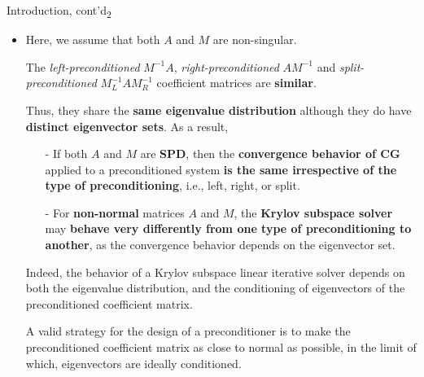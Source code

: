 \documentclass[t,usepdftitle=false]{beamer}
\begin{document}
\begin{frame}{Introduction, cont'd\textsubscript{2}}
\begin{itemize}
\item Here, we assume that both $A$ and $M$ are non-singular.
\item[] The \textit{left-preconditioned} $M^{-1}A$, \textit{right-preconditioned} $AM^{-1}$ and \textit{split-preconditioned} $M_L^{-1}AM_R^{-1}$ coefficient matrices are \textbf{similar}.
\item[] Thus, they share the \textbf{same eigenvalue distribution} although they do have \textbf{distinct eigenvector sets}.
As a result,
\begin{itemize}\normalsize
\item[-] If both $A$ and $M$ are \textbf{SPD}, then the \textbf{convergence behavior of CG} applied to a preconditioned system \textbf{is the same irrespective of the type of preconditioning}, i.e., left, right, or split.
\item[-] For \textbf{non-normal} matrices $A$ and $M$, the \textbf{Krylov subspace solver} may \textbf{behave very differently from one type of preconditioning to another}, as the convergence behavior depends on the eigenvector set.
\end{itemize}
Indeed, the behavior of a Krylov subspace linear iterative solver depends on both the eigenvalue distribution, and the conditioning of eigenvectors of the preconditioned coefficient matrix.
\item[] A valid strategy for the design of a preconditioner is to make the preconditioned coefficient matrix as close to normal as possible, in the limit of which, eigenvectors are ideally conditioned.
\end{itemize}
\end{frame}
\end{document}
